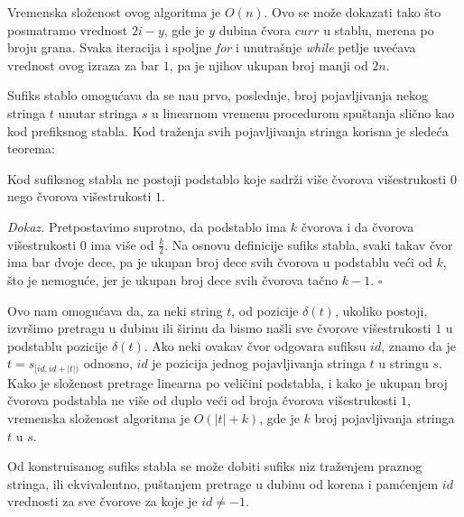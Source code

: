 \noindent
\begin{minipage}[l]{\textwidth}

\end{minipage}

Vremenska slo\v zenost ovog algoritma je $O(n)$. Ovo se mo\v ze dokazati tako \v sto posmatramo vrednost $2i-y$, gde je $y$ dubina \v cvora $curr$ u stablu, merena po broju grana. Svaka iteracija i spoljne \textit{for} i unutra\v snje \textit{while} petlje uve\' cava vrednost ovog izraza za bar $1$, pa je njihov ukupan broj manji od $2n$.

Sufiks stablo omogu\' cava da se na\dj u prvo, poslednje, broj pojavljivanja nekog stringa $t$ unutar stringa $s$ u linearnom vremenu procedurom spu\v stanja sli\v cno kao kod prefiksnog stabla. Kod tra\v zenja svih pojavljivanja stringa korisna je slede\' ca teorema:

\begin{thm}
Kod sufiksnog stabla ne postoji podstablo koje sadr\v zi vi\v se \v cvorova vi\v sestrukosti $0$ nego \v cvorova vi\v sestrukosti $1$.
\end{thm}

\textit{Dokaz.} Pretpostavimo suprotno, da podstablo ima $k$ \v cvorova i da \v cvorova vi\v sestrukosti $0$ ima vi\v se od $\frac{k}{2}$. Na osnovu definicije sufiks stabla, svaki takav \v cvor ima bar dvoje dece, pa je ukupan broj dece svih \v cvorova u podstablu ve\' ci od $k$, \v sto je nemogu\' ce, jer je ukupan broj dece svih \v cvorova ta\v cno $k-1$. \hfill $\square$

Ovo nam omogu\' cava da, za neki string $t$, od pozicije $\delta(t)$, ukoliko postoji, izvr\v simo pretragu u dubinu ili \v sirinu da bismo na\v sli sve \v cvorove vi\v sestrukosti $1$ u podstablu pozicije $\delta(t)$. Ako neki ovakav \v cvor odgovara sufiksu $id$, znamo da je $t = s_{[id, id+|t|)}$ odnosno, $id$ je pozicija jednog pojavljivanja stringa $t$ u stringu $s$. Kako je slo\v zenost pretrage linearna po veli\v cini podstabla, i kako je ukupan broj \v cvorova podstabla ne vi\v se od duplo ve\' ci od broja \v cvorova vi\v sestrukosti $1$, vremenska slo\v zenost algoritma je $O(|t|+k)$, gde je $k$ broj pojavljivanja stringa $t$ u $s$.

Od konstruisanog sufiks stabla se mo\v ze dobiti sufiks niz tra\v zenjem praznog stringa, ili ekvivalentno, pu\v stanjem pretrage u dubinu od korena i pam\' cenjem $id$ vrednosti za sve \v cvorove za koje je $id \not = -1$.

